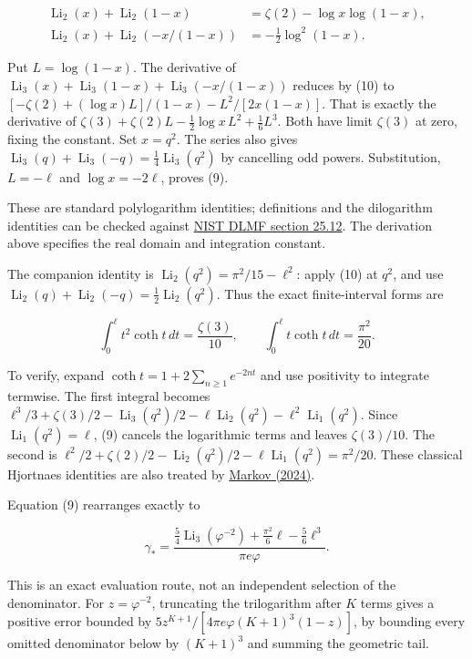 \documentclass[11pt,a4paper]{article}
\begin{document}
\[
\begin{aligned}
\operatorname{Li}_2(x)+\operatorname{Li}_2(1-x)&=\zeta(2)-\log x\log(1-x),\\
\operatorname{Li}_2(x)+\operatorname{Li}_2(-x/(1-x))&=-\tfrac12\log^2(1-x).
\end{aligned} \tag{10}
\]

Put $L=\log(1-x)$. The derivative of
$\operatorname{Li}_3(x)+\operatorname{Li}_3(1-x)+\operatorname{Li}_3(-x/(1-x))$
reduces by (10) to
$[-\zeta(2)+(\log x)L]/(1-x)-L^2/[2x(1-x)]$.
That is exactly the derivative of
$\zeta(3)+\zeta(2)L-\tfrac12\log x\,L^2+\tfrac16L^3$.
Both have limit $\zeta(3)$ at zero, fixing the constant.
Set $x=q^2$. The series also gives
$\operatorname{Li}_3(q)+\operatorname{Li}_3(-q)=\tfrac14\operatorname{Li}_3(q^2)$
by cancelling odd powers. Substitution, $L=-\ell$ and $\log x=-2\ell$, proves (9).


These are standard polylogarithm identities; definitions and the dilogarithm identities can be checked against \href{https://dlmf.nist.gov/25.12}{NIST DLMF section 25.12}. The derivation above specifies the real domain and integration constant.


The companion identity is $\operatorname{Li}_2(q^2)=\pi^2/15-\ell^2$: apply (10) at $q^2$, and use $\operatorname{Li}_2(q)+\operatorname{Li}_2(-q)=\tfrac12\operatorname{Li}_2(q^2)$. Thus the exact finite-interval forms are


\[
\int_0^\ell t^2\coth t\,dt=\frac{\zeta(3)}{10},
\qquad \int_0^\ell t\coth t\,dt=\frac{\pi^2}{20}. \tag{11}
\]

To verify, expand $\coth t=1+2\sum_{n\geq1}e^{-2nt}$ and use positivity to integrate termwise. The first integral becomes
$\ell^3/3+\zeta(3)/2-\operatorname{Li}_3(q^2)/2
-\ell\operatorname{Li}_2(q^2)-\ell^2\operatorname{Li}_1(q^2)$.
Since $\operatorname{Li}_1(q^2)=\ell$, (9) cancels the logarithmic terms and leaves $\zeta(3)/10$.
The second is $\ell^2/2+\zeta(2)/2-\operatorname{Li}_2(q^2)/2-\ell\operatorname{Li}_1(q^2)=\pi^2/20$.
These classical Hjortnaes identities are also treated by \href{https://www.diogenes.bg/ijam/contents/2024-37-3/2/2.pdf}{Markov (2024)}.


Equation (9) rearranges exactly to


\[
\gamma_*=\frac{\tfrac54\operatorname{Li}_3(\varphi^{-2})
+\tfrac{\pi^2}{6}\ell-\tfrac56\ell^3}{\pi e\varphi}. \tag{12}
\]

This is an exact evaluation route, not an independent selection of the denominator. For $z=\varphi^{-2}$, truncating the trilogarithm after $K$ terms gives a positive error bounded by
$5z^{K+1}/[4\pi e\varphi(K+1)^3(1-z)]$, by bounding every omitted denominator below by $(K+1)^3$ and summing the geometric tail.
\end{document}
